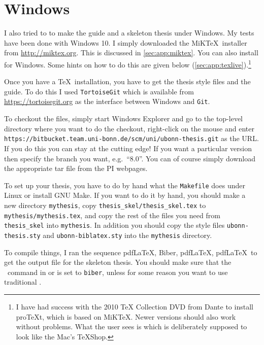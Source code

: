 \section{Windows}%
\label{sec:app:windows}

I also tried to to make the guide and a skeleton thesis under Windows. 
My tests have been done with Windows 10.
I simply downloaded the MiK\TeX\ installer from \url{http://miktex.org}.
This is discussed in \cref{sec:app:miktex}.
You can also install \TeXLive for Windows. Some hints on how to do
this are given below (\cref{sec:app:texlive}).\footnote{%
I have had success with the 2010 \TeX{} Collection DVD from Dante to install
pro\TeX t, which is based on MiK\TeX.
Newer versions should also work without problems.
What the user sees is \TeXworks
which is deliberately supposed to look like the Mac's \TeX Shop.}

Once you have a \TeX\ installation, you have to get the thesis style files and the guide.
To do this I used \texttt{TortoiseGit} which is available from
\url{https://tortoisegit.org} as the interface between Windows and
\texttt{Git}.

To checkout the files, simply start Windows Explorer and go to the
top-level directory where you want to do the checkout, right-click on
the mouse and enter\\
\texttt{https://bitbucket.team.uni-bonn.de/scm/uni/ubonn-thesis.git}
as the URL\@.
If you do this you can stay at the cutting edge!
If you want a particular version then specify the branch you want, e.g.\ \enquote{8.0}.
You can of course simply download the appropriate tar file from the PI webpages.

To set up your thesis, you have to do by hand what the
\texttt{Makefile} does under Linux or install GNU Make.
If you want to do it by hand, you should make a new directory
\texttt{mythesis}, copy \texttt{thesis\_skel/thesis\_skel.tex} to
\texttt{mythesis/mythesis.tex}, and copy the rest of the files you need from
\texttt{thesis\_skel} into \texttt{mythesis}. In addition you should
copy the style files \texttt{ubonn-thesis.sty} and \texttt{ubonn-biblatex.sty} into the
\texttt{mythesis} directory.

To compile things, I ran the sequence pdf\LaTeX, Biber, pdf\LaTeX,
pdf\LaTeX\ to get the output file for the skeleton thesis.
You should make sure that the \BibTeX\ command in \TeXstudio or \TeXworks
is set to \texttt{biber},
unless for some reason you want to use traditional \BibTeX.


